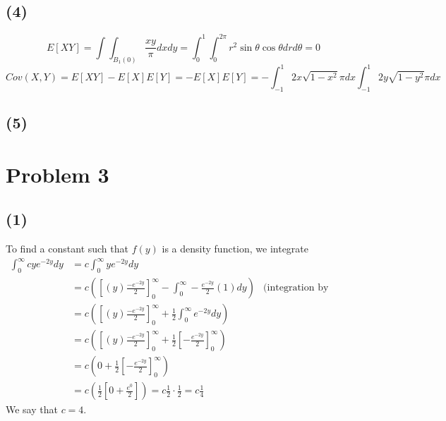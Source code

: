 \documentclass{article}
\theoremstyle{definition}
\begin{document}
    \subsection*{(4)}
        \[
            E[XY] = \int \int_{B_1(0)} \frac{xy}{\pi} dx dy = \int_0^1 \int_0^{2\pi} r^2 \sin \theta \cos \theta dr d\theta = 0
        \]
        \[
            Cov(X,Y) = E[XY] - E[X]E[Y] = -E[X]E[Y] = - \int_{-1}^1 2x \sqrt{1 - x^2}{\pi} dx \int_{-1}^1 2y \sqrt{1 - y^2}{\pi} dx
        \]
    \subsection*{(5)}
        
\section*{Problem 3}
    \subsection*{(1)}
        To find a constant such that $f(y)$ is a density function, we integrate 
        \begin{align*}
            \int_0^\infty c ye^{-2y} dy &= c \int_0^\infty ye^{-2y} dy\\
            &= c\left(\left[ (y) \frac{-e^{-2y}}{2} \right]_0^\infty - \int_0^\infty -\frac{e^{-2y}}{2} (1) dy \right)& \text{(integration by parts)}\\
            &= c\left(\left[ (y) \frac{-e^{-2y}}{2} \right]_0^\infty + \frac{1}{2} \int_0^\infty e^{-2y} dy \right)\\
            & = c\left(\left[ (y) \frac{-e^{-2y}}{2} \right]_0^\infty + \frac{1}{2} \left[ -\frac{e^{-2y}}{2}\right]_0^\infty \right)\\
            &= c\left( 0 + \frac{1}{2} \left[- \frac{e^{-2y}}{2}\right]_0^\infty \right)\\
            &= c\left(\frac{1}{2} \left[ 0 + \frac{e^{0}}{2}\right]\right) = c\frac{1}{2} \cdot \frac{1}{2} = c\frac{1}{4}
        \end{align*}
        We say that $c = 4$.
\end{document}
